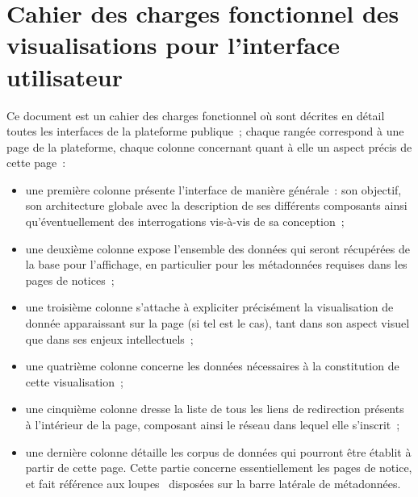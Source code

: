 \documentclass[a4paper,12pt,twoside]{book}
\newcommand{\clearemptydoublepage}{\newpage{\pagestyle{empty}\cleardoublepage}}
\newcommand{\g}[1]{\og#1~\fg}
\begin{document}
	

\clearemptydoublepage

	\chapter{\label{CahierDesCharges}Cahier des charges fonctionnel des visualisations pour l'interface utilisateur}
	Ce document est un cahier des charges fonctionnel où sont décrites en détail toutes les interfaces de la plateforme publique~; chaque rangée correspond à une page de la plateforme, chaque colonne concernant quant à elle un aspect précis de cette page~:

	\begin{itemize}
		\item une première colonne présente l'interface de manière générale~: son objectif, son architecture globale avec la description de ses différents composants ainsi qu'éventuellement des interrogations vis-à-vis de sa conception~;
		\item une deuxième colonne expose l'ensemble des données qui seront récupérées de la base pour l'affichage, en particulier pour les métadonnées requises dans les pages de notices~;
		\item une troisième colonne s'attache à expliciter précisément la visualisation de donnée apparaissant sur la page (si tel est le cas), tant dans son aspect visuel que dans ses enjeux intellectuels~;
		\item une quatrième colonne concerne les données nécessaires à la constitution de cette visualisation~;
		\item une cinquième colonne dresse la liste de tous les liens de redirection présents à l'intérieur de la page, composant ainsi le réseau dans lequel elle s'inscrit~;
		\item une dernière colonne détaille les corpus de données qui pourront être établit à partir de cette page. Cette partie concerne essentiellement les pages de notice, et fait référence aux \g{loupes} disposées sur la barre latérale de métadonnées.
	\end{itemize}

	\begin{landscape}
		
	\end{landscape}
	
\clearemptydoublepage
\end{document}
